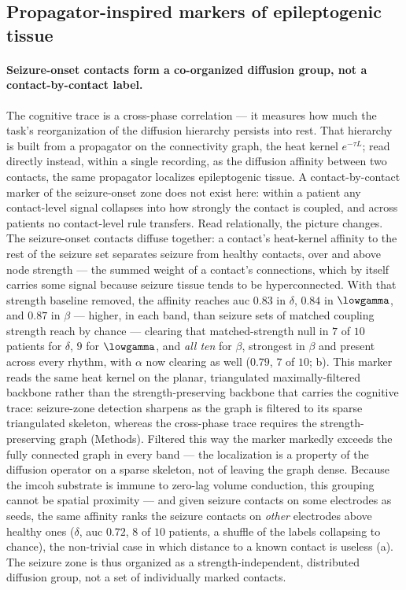 %
    \subsection{Propagator-inspired markers of epileptogenic tissue}
        \label{ssec:epileptogenic}
%
\paragraph{Seizure-onset contacts form a co-organized diffusion group, not a contact-by-contact label.}
The cognitive trace is a cross-phase correlation --- it measures how much the task's reorganization of the diffusion hierarchy persists into rest. That hierarchy is built from a propagator on the connectivity graph, the heat kernel \(e^{-\tau L}\); read directly instead, within a single recording, as the diffusion affinity between two contacts, the same propagator localizes epileptogenic tissue. A contact-by-contact marker of the seizure-onset zone does not exist here: within a patient any contact-level signal collapses into how strongly the contact is coupled, and across patients no contact-level rule transfers. Read relationally, the picture changes. The seizure-onset contacts diffuse together: a contact's heat-kernel affinity to the rest of the seizure set separates seizure from healthy contacts, over and above node strength --- the summed weight of a contact's connections, which by itself carries some signal because seizure tissue tends to be hyperconnected. With that strength baseline removed, the affinity reaches \gls{auc} \(0.83\) in \(\delta\), \(0.84\) in \(\lowgamma\), and \(0.87\) in \(\beta\) --- higher, in each band, than seizure sets of matched coupling strength reach by chance --- clearing that matched-strength null in \(7\) of \(10\) patients for \(\delta\), \(9\) for \(\lowgamma\), and \emph{all ten} for \(\beta\), strongest in \(\beta\) and present across every rhythm, with \(\alpha\) now clearing as well (\(0.79\), \(7\) of \(10\); b). This marker reads the same heat kernel on the planar, triangulated maximally-filtered backbone rather than the strength-preserving backbone that carries the cognitive trace: seizure-zone detection sharpens as the graph is filtered to its sparse triangulated skeleton, whereas the cross-phase trace requires the strength-preserving graph (Methods). Filtered this way the marker markedly exceeds the fully connected graph in every band --- the localization is a property of the diffusion operator on a sparse skeleton, not of leaving the graph dense. Because the \gls{imcoh} substrate is immune to zero-lag volume conduction, this grouping cannot be spatial proximity --- and given seizure contacts on some electrodes as seeds, the same affinity ranks the seizure contacts on \emph{other} electrodes above healthy ones (\(\delta\), \gls{auc} \(0.72\), \(8\) of \(10\) patients, a shuffle of the labels collapsing to chance), the non-trivial case in which distance to a known contact is useless (a). The seizure zone is thus organized as a strength-independent, distributed diffusion group, not a set of individually marked contacts.

